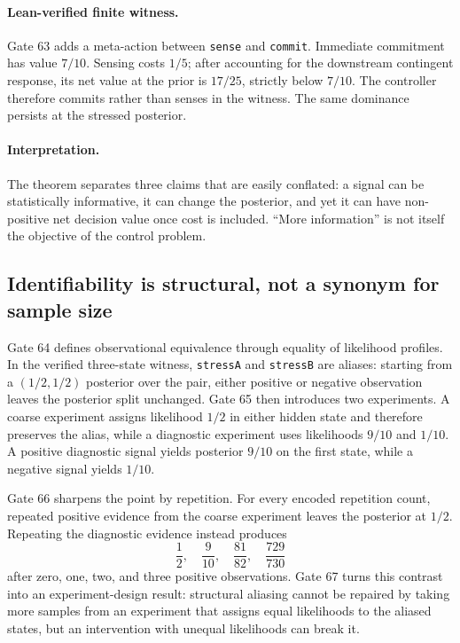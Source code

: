 \paragraph{Lean-verified finite witness.}
Gate 63 adds a meta-action between \texttt{sense} and \texttt{commit}. Immediate commitment has value $7/10$. Sensing costs $1/5$; after accounting for the downstream contingent response, its net value at the prior is $17/25$, strictly below $7/10$. The controller therefore commits rather than senses in the witness. The same dominance persists at the stressed posterior.

\paragraph{Interpretation.}
The theorem separates three claims that are easily conflated: a signal can be statistically informative, it can change the posterior, and yet it can have non-positive net decision value once cost is included. ``More information'' is not itself the objective of the control problem.

\subsection{Identifiability is structural, not a synonym for sample size}

Gate 64 defines observational equivalence through equality of likelihood profiles. In the verified three-state witness, \texttt{stressA} and \texttt{stressB} are aliases: starting from a $(1/2,1/2)$ posterior over the pair, either positive or negative observation leaves the posterior split unchanged. Gate 65 then introduces two experiments. A coarse experiment assigns likelihood $1/2$ in either hidden state and therefore preserves the alias, while a diagnostic experiment uses likelihoods $9/10$ and $1/10$. A positive diagnostic signal yields posterior $9/10$ on the first state, while a negative signal yields $1/10$.

Gate 66 sharpens the point by repetition. For every encoded repetition count, repeated positive evidence from the coarse experiment leaves the posterior at $1/2$. Repeating the diagnostic evidence instead produces
\[
\frac12,
\quad \frac9{10},
\quad \frac{81}{82},
\quad \frac{729}{730}
\]
after zero, one, two, and three positive observations. Gate 67 turns this contrast into an experiment-design result: structural aliasing cannot be repaired by taking more samples from an experiment that assigns equal likelihoods to the aliased states, but an intervention with unequal likelihoods can break it.

